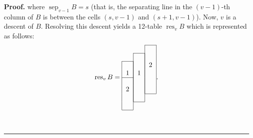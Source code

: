 \documentclass[numbers=enddot,12pt,final,onecolumn,notitlepage]{scrartcl}%
\theoremstyle{definition}
\newenvironment{proof}[1][Proof]{\noindent\textbf{#1.} }{\ \rule{0.5em}{0.5em}}
\begin{document}
\begin{proof}
where $\operatorname*{sep}\nolimits_{v-1}B = s$
(that is, the separating line in the
$\left(v-1\right)$-th column of $B$
is between the cells $\left(s,v-1\right)$ and
$\left(s+1,v-1\right)$).
Now, $v$ is a descent of $B$.
Resolving this descent yields a
12-table $\operatorname{res}_{v}B$ which is represented as follows:
\[
\operatorname*{res}\nolimits_{v}B=%
\begin{tabular}{ccc}
\cline{3-3} & & \multicolumn{1}{|c|}{} \\
\cline{2-2} & \multicolumn{1}{|c|}{} & \multicolumn{1}{|c|}{} \\
\cline{1-1} \multicolumn{1}{|c|}{} & \multicolumn{1}{|c|}{} & \multicolumn
{1}{|c|}{2} \\
\multicolumn{1}{|c|}{1} & \multicolumn{1}{|c|}{1} & \multicolumn{1}{|c|}{} \\
\cline{1-1} \multicolumn{1}{|c|}{} & \multicolumn{1}{|c|}{} & \multicolumn
{1}{|c|}{} \\
\multicolumn{1}{|c|}{2} & \multicolumn{1}{|c|}{} & \multicolumn{1}{|c|}{} \\
\cline{3-3} \multicolumn{1}{|c|}{} & \multicolumn{1}{|c|}{} \\
\cline{2-2} \multicolumn{1}{|c|}{} \\
\cline{1-1}
\end{tabular}%
.
\]

\end{proof}
\end{document}
